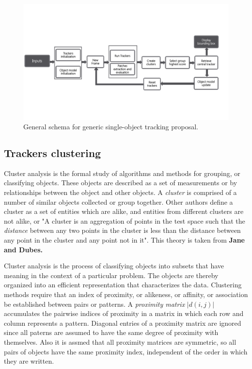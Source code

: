 \begin{figure}[t!]
	\centering
		\includegraphics[width=1\linewidth, trim= 0cm 3cm 1cm 4cm, clip=true]{Figures/block_diagram.pdf}
	\caption{General schema for generic single-object tracking proposal.}
	\label{fig::diagram}
\end{figure}

\subsection{Trackers clustering}

Cluster analysis is the formal study of algorithms and methods for grouping, or classifying objects. These objects are described as a set of measurements or by relationships between the object and other objects. A \textit{cluster} is comprised of a number of similar objects collected or group together. Other authors define a cluster as a set of entities which are alike, and entities from different clusters are not alike, or "A cluster is an aggregation of points in the test space such that the \textit{distance} between any two points in the cluster is less than the distance between any point in the cluster and any point not in it". This theory is taken from \textbf{Jane and Dubes.}

Cluster analysis is the process of classifying objects into subsets that have meaning in the context of a particular problem. The objects are thereby organized into an efficient representation that characterizes the data. Clustering methods require that an index of proximity, or alikeness, or affinity, or association be established between pairs or patterns. A \textit{proximity matrix} $|d(i, j)|$ accumulates the pairwise indices of proximity in a matrix in which each row and column represents a pattern. Diagonal entries of a proximity matrix are ignored since all paterns are assumed to have the same degree of proximity with themselves. Also it is assmed that all proximity matrices are symmetric, so all pairs of objects have the same proximity index, independent of the order in which they are written.

